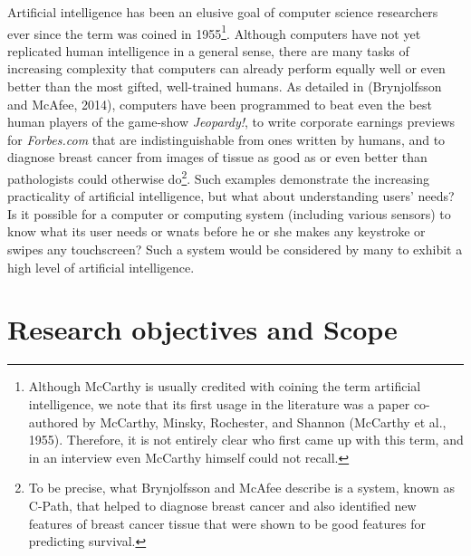Artificial intelligence has been an elusive goal of computer science researchers ever since the term was coined in 1955\footnote{Although McCarthy is usually credited with coining the term artificial intelligence, we note that its first usage in the literature was a paper co-authored by McCarthy, Minsky, Rochester, and Shannon (McCarthy et al., 1955). Therefore, it is not entirely clear who first came up with this term, and in an interview even McCarthy himself could not recall.}. Although computers have not yet replicated human intelligence in a general sense, there are many tasks of increasing complexity that computers can already perform equally well or even better than the most gifted, well-trained humans. As detailed in (Brynjolfsson and McAfee, 2014), computers have been programmed to beat even the best human players of the game-show \emph{Jeopardy!}, to write corporate earnings previews for \emph{Forbes.com} that are indistinguishable from ones written by humans, and to diagnose breast cancer from images of tissue as good as or even better than pathologists could otherwise do\footnote{To be precise, what Brynjolfsson and McAfee describe is a system, known as C-Path, that helped to diagnose breast cancer and also identified new features of breast cancer tissue that were shown to be good features for predicting survival.}. Such examples demonstrate the increasing practicality of artificial intelligence, but what about understanding users' needs? Is it possible for a computer or computing system (including various sensors) to know what its user needs or wnats before he or she makes any keystroke or swipes any touchscreen? Such a system would be considered by many to exhibit a high level of artificial intelligence.

\section{Research objectives and Scope}
\label{sec:objectives}

